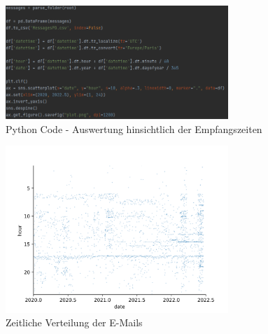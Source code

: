 \begin{figure}
    \centering
    \includegraphics[width=0.75\textwidth]{images/Auswertung_Zeiten.PNG}
    \caption{Python Code - Auswertung hinsichtlich der Empfangszeiten} 
    \label{fig:emailsdatetime}
\end{figure}

\begin{figure}
    \centering
    \includegraphics[width=0.75\textwidth]{images/plot.PNG}
    \caption{Zeitliche Verteilung der E-Mails} 
    \label{fig:auswertungzeitlich}
\end{figure}